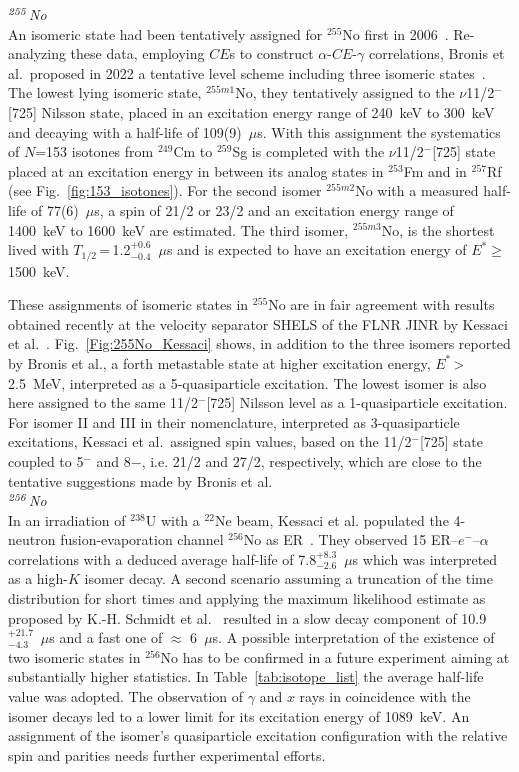 {\it $^{\it255}$No}\\
An isomeric state had been tentatively assigned for $^{255}$No first in 2006~\cite{Hessberger2006a}. 
Re-analyzing these data, employing $CE$s to construct $\alpha$-$CE$-$\gamma$ correlations, Bronis et al.~proposed in 2022 a tentative level scheme including three isomeric states~\cite{Bronis2022}. 
The lowest lying isomeric state, $^{255m1}$No, they tentatively assigned to the $\nu$11/2$^-$[725] Nilsson state, placed in an excitation energy range of 240~keV to 300~keV and decaying with a half-life of 109(9)~$\mu$s.
With this assignment the systematics of $N$=153 isotones from $^{249}$Cm to $^{259}$Sg is completed with the $\nu$11/2$^-$[725] state placed at an excitation energy in between its analog states in $^{253}$Fm and in $^{257}$Rf (see Fig.~\ref{fig:153_isotones}).
For the second isomer $^{255m2}$No with a measured half-life of 77(6)~$\mu$s, a spin of 21/2 or 23/2 and an excitation energy range of 1400~keV to 1600~keV are estimated. 
The third isomer, $^{255m3}$No, is the shortest lived with $T_{1/2}$\,=\,1.2$^{+0.6}_{-0.4}$~$\mu$s and is expected to have an excitation energy of $E^*\geq$1500~keV.

These assignments of isomeric states in $^{255}$No are in fair agreement with results obtained recently at the velocity separator SHELS of the FLNR JINR by Kessaci et al.~\cite{Kessaci2024}.
Fig.~\ref{Fig:255No_Kessaci} shows, in addition to the three isomers reported by Bronis et al., a forth metastable state at higher excitation energy, $E^*$\,>\,2.5~MeV, interpreted as a 5-quasiparticle excitation.
The lowest isomer is also here assigned to the same 11/2$^-$[725] Nilsson level as a 1-quasiparticle excitation.
For isomer II and III in their nomenclature, interpreted as 3-quasiparticle excitations, Kessaci et al.~assigned spin values, based on the 11/2$^-$[725] state coupled to 5$^-$ and 8$-$, i.e. 21/2 and 27/2, respectively, which are close to the tentative suggestions made by Bronis et al.\\

{\it $^{\it256}$No}\\
In an irradiation of $^{238}$U with a $^{22}$Ne beam, Kessaci et al. populated the 4-neutron fusion-evaporation channel $^{256}$No as ER~\cite{Kessaci2021}. 
They observed 15 ER--$e^-$--$\alpha$ correlations with a deduced average half-life of 7.8$^{+8.3}_{-2.6}$~$\mu$s which was interpreted as a high-$K$ isomer decay.
A second scenario assuming a truncation of the time distribution for short times and applying the maximum likelihood estimate as proposed by K.-H. Schmidt et al.~\cite{Schmidt1984} resulted in a slow decay component of 10.9$^{+21.7}_{-4.3}$~$\mu$s and a fast one of $\approx$ 6~$\mu$s. A possible interpretation of the existence of two isomeric states in $^{256}$No has to be confirmed in a future experiment aiming at substantially higher statistics. 
In Table~\ref{tab:isotope_list} the average half-life value was adopted. 
The observation of $\gamma$ and $x$ rays in coincidence with the isomer decays led to a lower limit for its excitation energy of 1089~keV. An assignment of the isomer's quasiparticle excitation configuration with the relative spin and parities needs further experimental efforts.
 
